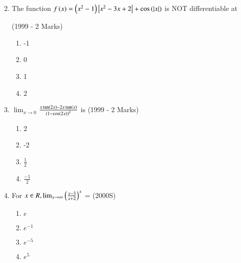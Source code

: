 \documentclass[journal,12pt,onecolumn]{IEEEtran}
\theoremstyle{remark}
\begin{document}
\begin{enumerate}
\begin{multicols}{2}
\begin{enumerate}
     \end{enumerate}
 \end{multicols}

\item The function $f\left(x\right)=\left(x^2-1\right)\left\vert x^2-3x+2\right\vert+\cos\left(\left\vert x\right\vert\right)$ is NOT differentiable at

	\hfill{(1999 - 2 Marks)}
 \begin{multicols}{2}	
     \begin{enumerate}
         \item -1
         \item 0
         \item 1
         \item 2
         
     \end{enumerate}
 \end{multicols}	

\item $\lim_{x\to0}$$\frac{x\tan\left(2x\right)-2x\tan\left(x\right)}{\left(1-\cos\left(2x\right)\right)^2}$ is
	\hfill{(1999 - 2 Marks)}
 \begin{multicols}{2}	
    \begin{enumerate}
        \item 2
        
        \item -2

        \item $\frac{1}{2}$
        
        \item $\frac{-1}{2}$
        
    \end{enumerate}
 \end{multicols}	

\item For $x\in R, \lim_{x\to \infty}\left(\frac{x-3}{x+2}\right)^x$ =
	\hfill{(2000S)}
 \begin{multicols}{2}	
   \begin{enumerate}
       \item $e$
       \item $e^{-1}$
       \item $e^{-5}$
       \item $e^{5}$
       
   \end{enumerate}
 \end{multicols}	

\end{enumerate}
\end{document}
